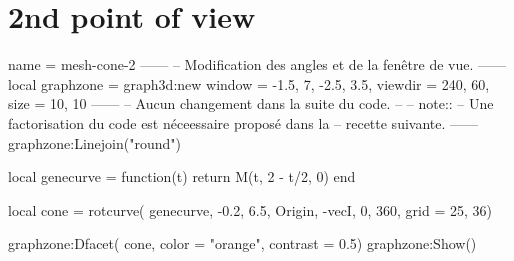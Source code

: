 \documentclass[varwidth, border = 3pt]{standalone}
\begin{document}
\section*{2nd point of view}

\begin{luadraw}{name = mesh-cone-2}
------
-- Modification des angles et de la fenêtre de vue.
------
    local graphzone = graph3d:new{
        window  = {-1.5, 7, -2.5, 3.5},
        viewdir = {240, 60},
        size    = {10, 10}
    }
------
-- Aucun changement dans la suite du code.
--
-- note::
--     Une factorisation du code est néceessaire proposé dans la
--     recette suivante.
------
    graphzone:Linejoin("round")

    local genecurve = function(t)
        return M(t, 2 - t/2, 0)
    end

    local cone = rotcurve(
        genecurve,
        -0.2, 6.5,
        {Origin, -vecI},
        0, 360,
        {grid = {25, 36}})

    graphzone:Dfacet(
        cone,
        {color    = "orange",
		 contrast = 0.5})
    graphzone:Show()
\end{luadraw}
\end{document}
